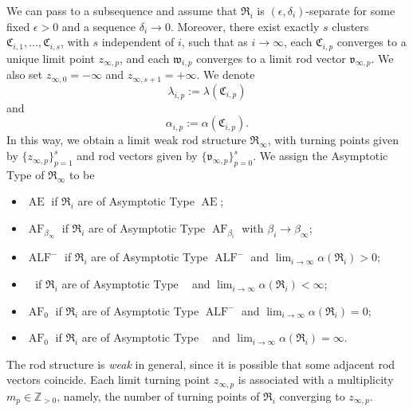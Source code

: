 \documentclass[a4paper,11pt]{amsart}
\theoremstyle{definition}
\numberwithin{equation}{section}
\newcommand{\mR} {\mathfrak R}
\newcommand{\mC} {\mathfrak C}
\DeclareMathOperator{\Ae}{AE}
\DeclareMathOperator{\ALF}{ALF}
\DeclareMathOperator{\ALFp}{ALF^+}
\DeclareMathOperator{\AF}{AF}
\begin{document}
We can pass to a subsequence and assume that \( \mathfrak{R}_i \) is \( (\epsilon, \delta_i) \)-separate for some fixed \( \epsilon > 0 \) and a sequence \( \delta_i \to 0 \).  
Moreover, there exist exactly \( s \) clusters \( \mathfrak{C}_{i, 1}, \dots, \mathfrak{C}_{i, s} \), with $s$ independent of \( i \), such that as \( i \to \infty \), each \( \mathfrak{C}_{i,p} \) converges to a unique limit point \( z_{\infty, p} \), and each \( \mathfrak{w}_{i,p} \) converges to a limit rod vector \( \mathfrak{v}_{\infty, p} \). We also set \( z_{\infty, 0} = -\infty \) and \( z_{\infty, s+1} = +\infty \). We denote 
\begin{equation}\label{eq:definition of lambda for clusters}
    \lambda_{i, p}:=\lambda(\mC_{i, p})
\end{equation}
and 
\begin{equation}\label{eq:definition of alpha for clusters}
    \alpha_{i, p}:=\alpha(\mC_{i, p}).
\end{equation}  
In this way, we obtain a limit weak rod structure \( \mathfrak{R}_\infty \), with turning points given by \( \{z_{\infty, p}\}_{p=1}^{s} \) and rod vectors given by \( \{\mathfrak{v}_{\infty, p}\}_{p=0}^{s} \).  We assign the Asymptotic Type of $\mR_\infty$ to be
\begin{itemize}
    \item $\Ae$ if $\mR_i$ are of Asymptotic Type $\Ae$;
    \item $\AF_{\beta_\infty}$ if $\mR_i$ are of Asymptotic Type $\AF_{\beta_i}$ with $\beta_i\rightarrow\beta_\infty$;
    \item $\ALF^-$ if $\mR_i$ are of Asymptotic Type $\ALF^-$ and $\lim_{i\rightarrow\infty}\alpha(\mR_i)>0$;
    \item $\ALFp$ if $\mR_i$ are of Asymptotic Type $\ALFp$ and $\lim_{i\rightarrow\infty}\alpha(\mR_i)<\infty$;
    \item $\AF_0$ if  $\mR_i$ are of Asymptotic Type $\ALF^-$ and $\lim_{i\rightarrow\infty}\alpha(\mR_i)=0$;
    \item $\AF_0$ if $\mR_i$ are of Asymptotic Type $\ALFp$ and $\lim_{i\rightarrow\infty}\alpha(\mR_i)=\infty$.
\end{itemize}

The rod structure is \emph{weak} in general, since it is possible that some adjacent rod vectors coincide.  Each limit turning point \( z_{\infty, p} \) is associated with a multiplicity \( m_p \in \mathbb{Z}_{>0} \), namely, the number of turning points of $\mR_i$ converging to $z_{\infty,p}$.  
\end{document}
